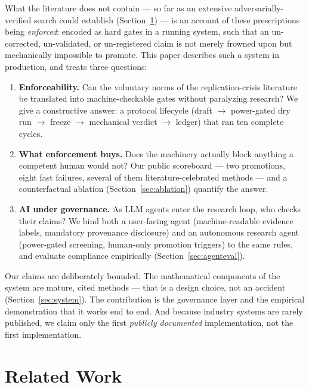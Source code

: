 \documentclass[11pt]{article}
\begin{document}
What the literature does not contain --- so far as an extensive
adversarially-verified search could establish (Section~\ref{sec:related})
--- is an account of these prescriptions being \emph{enforced}: encoded
as hard gates in a running system, such that an un-corrected,
un-validated, or un-registered claim is not merely frowned upon but
mechanically impossible to promote. This paper describes such a system
in production, and treats three questions:

\begin{enumerate}
\item \textbf{Enforceability.} Can the voluntary norms of the
  replication-crisis literature be translated into machine-checkable
  gates without paralyzing research? We give a constructive answer: a
  protocol lifecycle (draft $\to$ power-gated dry run $\to$ freeze $\to$
  mechanical verdict $\to$ ledger) that ran ten complete cycles.
\item \textbf{What enforcement buys.} Does the machinery actually block
  anything a competent human would not? Our public scoreboard --- two
  promotions, eight fast failures, several of them literature-celebrated
  methods --- and a counterfactual ablation (Section~\ref{sec:ablation})
  quantify the answer.
\item \textbf{AI under governance.} As LLM agents enter the research
  loop, who checks their claims? We bind both a user-facing agent
  (machine-readable evidence labels, mandatory provenance disclosure)
  and an autonomous research agent (power-gated screening, human-only
  promotion triggers) to the same rules, and evaluate compliance
  empirically (Section~\ref{sec:agenteval}).
\end{enumerate}

Our claims are deliberately bounded. The mathematical components of the
system are mature, cited methods --- that is a design choice, not an
accident (Section~\ref{sec:system}). The contribution is the governance
layer and the empirical demonstration that it works end to end. And
because industry systems are rarely published, we claim only the first
\emph{publicly documented} implementation, not the first implementation.

\section{Related Work}\label{sec:related}
\end{document}
